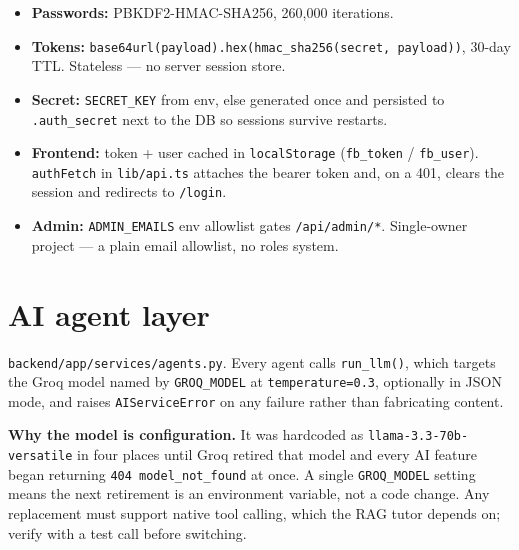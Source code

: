 \documentclass[11pt,a4paper]{article}
\newcommand{\code}[1]{\colorbox{fbCream}{\texttt{\small #1}}}
\begin{document}
\begin{itemize}[leftmargin=1.4em]
\item \textbf{Passwords:} PBKDF2-HMAC-SHA256, 260{,}000 iterations.
\item \textbf{Tokens:} \code{base64url(payload).hex(hmac\_sha256(secret, payload))},
  30-day TTL. Stateless --- no server session store.
\item \textbf{Secret:} \code{SECRET\_KEY} from env, else generated once and
  persisted to \code{.auth\_secret} next to the DB so sessions survive restarts.
\item \textbf{Frontend:} token + user cached in \code{localStorage}
  (\code{fb\_token} / \code{fb\_user}). \code{authFetch} in \code{lib/api.ts}
  attaches the bearer token and, on a 401, clears the session and redirects to
  \code{/login}.
\item \textbf{Admin:} \code{ADMIN\_EMAILS} env allowlist gates \code{/api/admin/*}.
  Single-owner project --- a plain email allowlist, no roles system.
\end{itemize}

\section{AI agent layer}

\code{backend/app/services/agents.py}. Every agent calls \code{run\_llm()}, which
targets the Groq model named by \code{GROQ\_MODEL} at \code{temperature=0.3},
optionally in JSON mode, and raises \code{AIServiceError} on any failure rather
than fabricating content.

\begin{tcolorbox}[colback=fbCream,colframe=fbSage,boxrule=1pt,arc=2pt,left=8pt,right=8pt,top=6pt,bottom=6pt]
\textbf{Why the model is configuration.} It was hardcoded as
\code{llama-3.3-70b-versatile} in four places until Groq retired that model and
every AI feature began returning \code{404 model\_not\_found} at once. A single
\code{GROQ\_MODEL} setting means the next retirement is an environment variable,
not a code change. Any replacement must support native tool calling, which the
RAG tutor depends on; verify with a test call before switching.
\end{tcolorbox}
\end{document}
